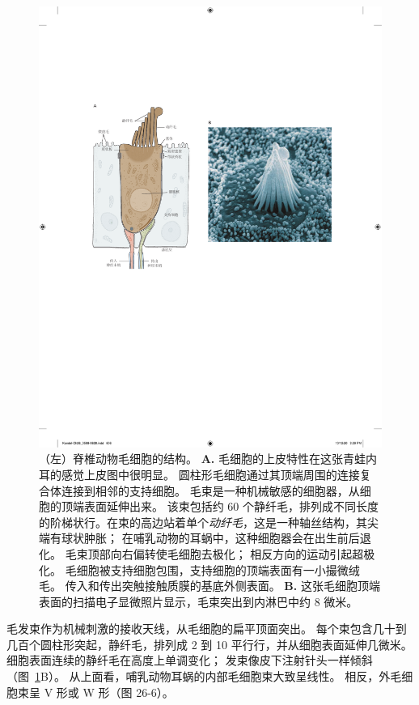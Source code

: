 \begin{figure}[htbp]
	\centering
	\includegraphics[width=0.8\linewidth]{chap26/fig_26_5}
	\caption{（左）脊椎动物毛细胞的结构。
		\textbf{A.} 毛细胞的上皮特性在这张青蛙内耳的感觉上皮图中很明显。
		圆柱形毛细胞通过其顶端周围的连接复合体连接到相邻的支持细胞。
		毛束是一种机械敏感的细胞器，从细胞的顶端表面延伸出来。
		该束包括约 60 个静纤毛，排列成不同长度的阶梯状行。在束的高边站着单个\textit{动纤毛}，这是一种轴丝结构，其尖端有球状肿胀；
		在哺乳动物的耳蜗中，这种细胞器会在出生前后退化。
		毛束顶部向右偏转使毛细胞去极化；
		相反方向的运动引起超极化。
		毛细胞被支持细胞包围，支持细胞的顶端表面有一小撮微绒毛。
		传入和传出突触接触质膜的基底外侧表面。 
		\textbf{B.} 这张毛细胞顶端表面的扫描电子显微照片显示，毛束突出到内淋巴中约 8 微米。}
	\label{fig:26_5}
\end{figure}


毛发束作为机械刺激的接收天线，从毛细胞的扁平顶面突出。
每个束包含几十到几百个圆柱形突起，静纤毛，排列成 2 到 10 平行行，并从细胞表面延伸几微米。
细胞表面连续的静纤毛在高度上单调变化；
发束像皮下注射针头一样倾斜（图~\ref{fig:26_5}B）。
从上面看，哺乳动物耳蜗的内部毛细胞束大致呈线性。 
相反，外毛细胞束呈 V 形或 W 形（图 26-6）。


